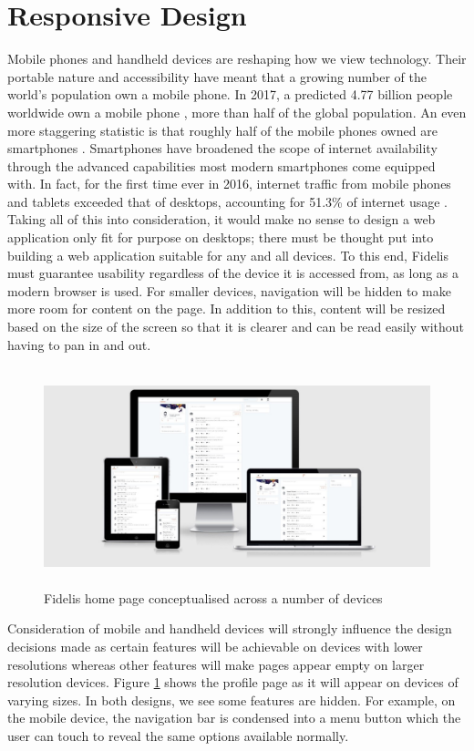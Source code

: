 \section{Responsive Design}
Mobile phones and handheld devices are reshaping how we view technology. Their portable nature and accessibility have meant that a growing number of the world's population own a mobile phone. In 2017, a predicted 4.77 billion people worldwide own a mobile phone \cite{Statista:Mobile}, more than half of the global population. An even more staggering statistic is that roughly half of the mobile phones owned are smartphones \cite{Statista:Smartphones}. Smartphones have broadened the scope of internet availability through the advanced capabilities most modern smartphones come equipped with. In fact, for the first time ever in 2016, internet traffic from mobile phones and tablets exceeded that of desktops, accounting for 51.3\% of internet usage \cite{StatCounter:MobileInternetTraffic}. Taking all of this into consideration, it would make no sense to design a web application only fit for purpose on desktops; there must be thought put into building a web application suitable for any and all devices. To this end, Fidelis must guarantee usability regardless of the device it is accessed from, as long as a modern browser is used. For smaller devices, navigation will be hidden to make more room for content on the page. In addition to this, content will be resized based on the size of the screen so that it is clearer and can be read easily without having to pan in and out.

\begin{figure}[H]
    \centering
    \includegraphics[height=2.5in]{Images/Design/ResponsivePages}
    \caption{Fidelis home page conceptualised across a number of devices}
    \label{fig:responsive}
\end{figure}

Consideration of mobile and handheld devices will strongly influence the design decisions made as certain features will be achievable on devices with lower resolutions whereas other features will make pages appear empty on larger resolution devices. Figure \ref{fig:responsive} shows the profile page as it will appear on devices of varying sizes. In both designs, we see some features are hidden. For example, on the mobile device, the navigation bar is condensed into a menu button which the user can touch to reveal the same options available normally. 